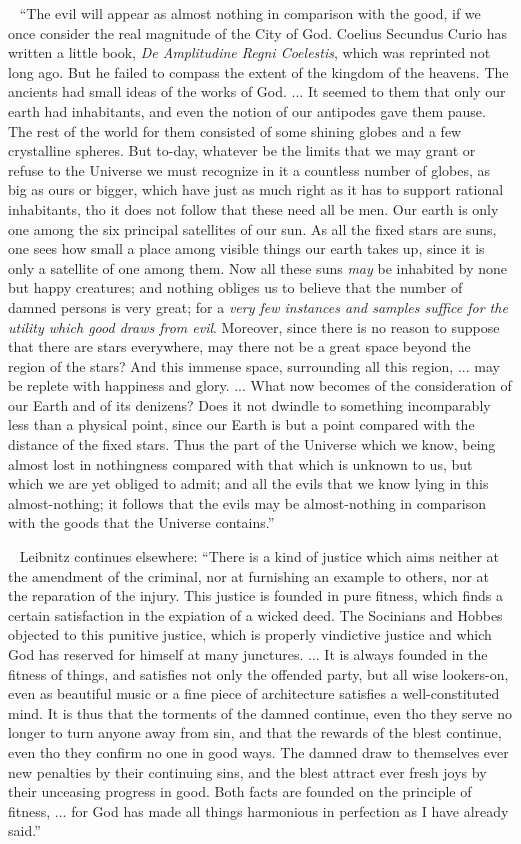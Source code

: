 \documentclass[12pt]{article}
\newcounter{wjparagraph}[section]
\newcommand*{\wjparagraph}{\stepcounter{wjparagraph}~\marginpar{\tiny\arabic{wjparagraph} }}
\begin{document}
\wjparagraph
``The evil will appear as almost nothing in comparison with the good, if we once consider the real magnitude of the City of God. Coelius Secundus Curio has written a little book, \emph{De Amplitudine Regni Coelestis}, which was reprinted not long ago. But he failed to compass the extent of the kingdom of the heavens. The ancients had small ideas of the works of God. ... It seemed to them that only our earth had inhabitants, and even the notion of our antipodes gave them pause. The rest of the world for them consisted of some shining globes and a few crystalline spheres. But to-day, whatever be the limits that we may grant or refuse to the Universe we must recognize in it a countless number of globes, as big as ours or bigger, which have just as much right as it has to support rational inhabitants, tho it does not follow that these need all be men. Our earth is only one among the six principal satellites of our sun. As all the fixed stars are suns, one sees how small a place among visible things our earth takes up, since it is only a satellite of one among them. Now all these suns \emph{may} be inhabited by none but happy creatures; and nothing obliges us to believe that the number of damned persons is very great; for a \emph{very few instances and samples suffice for the utility which good draws from evil}. Moreover, since there is no reason to suppose that there are stars everywhere, may there not be a great space beyond the region of the stars? And this immense space, surrounding all this region, ... may be replete with happiness and glory. ... What now becomes of the consideration of our Earth and of its denizens? Does it not dwindle to something incomparably less than a physical point, since our Earth is but a point compared with the distance of the fixed stars. Thus the part of the Universe which we know, being almost lost in nothingness compared with that which is unknown to us, but which we are yet obliged to admit; and all the evils that we know lying in this almost-nothing; it follows that the evils may be almost-nothing in comparison with the goods that the Universe contains.''

\wjparagraph
Leibnitz continues elsewhere: ``There is a kind of justice which aims neither at the amendment of the criminal, nor at furnishing an example to others, nor at the reparation of the injury. This justice is founded in pure fitness, which finds a certain satisfaction in the expiation of a wicked deed. The Socinians and Hobbes objected to this punitive justice, which is properly vindictive justice and which God has reserved for himself at many junctures. ... It is always founded in the fitness of things, and satisfies not only the offended party, but all wise lookers-on, even as beautiful music or a fine piece of architecture satisfies a well-constituted mind. It is thus that the torments of the damned continue, even tho they serve no longer to turn anyone away from sin, and that the rewards of the blest continue, even tho they confirm no one in good ways. The damned draw to themselves ever new penalties by their continuing sins, and the blest attract ever fresh joys by their unceasing progress in good. Both facts are founded on the principle of fitness, ... for God has made all things harmonious in perfection as I have already said.''
\end{document}
